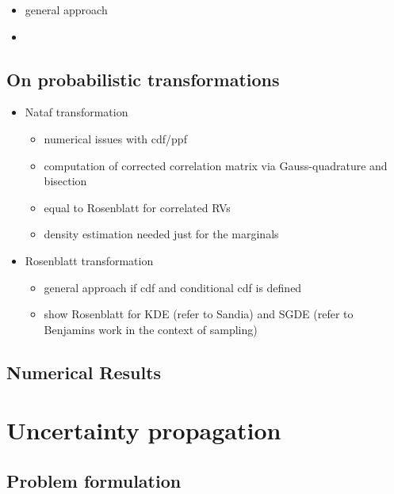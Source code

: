 \begin{itemize}
\item general approach
\item {}
\end{itemize}

\section{On probabilistic transformations}
\label{sec:on-prob-transformations}

\begin{itemize}
\item Nataf transformation
  \begin{itemize}
  \item numerical issues with cdf/ppf
  \item computation of corrected correlation matrix via
    Gauss-quadrature and bisection
  \item equal to Rosenblatt for correlated RVs
  \item density estimation needed just for the marginals
  \end{itemize}
\item Rosenblatt transformation
  \begin{itemize}
  \item general approach if cdf and conditional cdf is defined
  \item show Rosenblatt for KDE (refer to Sandia) and SGDE (refer to
    Benjamins work in the context of sampling)
  \end{itemize}
\end{itemize}

\section{Numerical Results}
\label{sec:im-numerical-results}


\chapter{Uncertainty propagation}
\label{cha:uncert-prop}

\section{Problem formulation}
\label{sec:problem-formulation}

